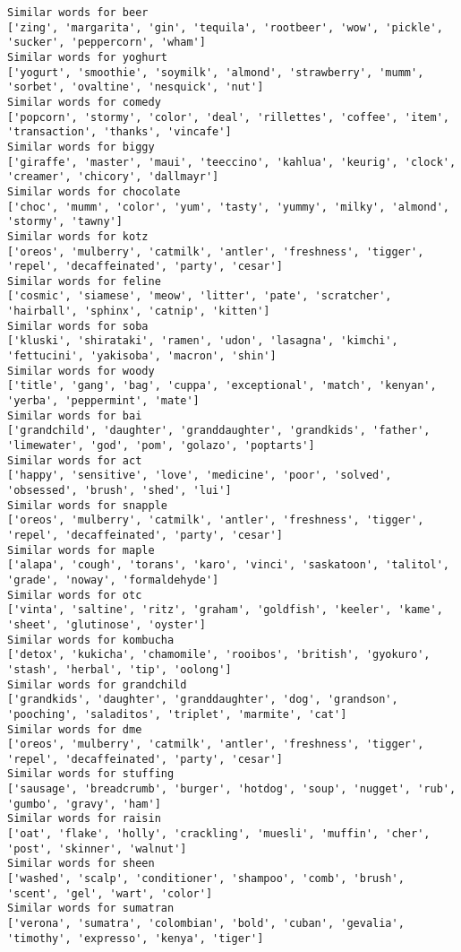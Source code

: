 \documentclass[11pt]{article}
\begin{document}
\begin{Verbatim}[commandchars=\\\{\}]
Similar words for beer
['zing', 'margarita', 'gin', 'tequila', 'rootbeer', 'wow', 'pickle', 'sucker', 'peppercorn', 'wham']
Similar words for yoghurt
['yogurt', 'smoothie', 'soymilk', 'almond', 'strawberry', 'mumm', 'sorbet', 'ovaltine', 'nesquick', 'nut']
Similar words for comedy
['popcorn', 'stormy', 'color', 'deal', 'rillettes', 'coffee', 'item', 'transaction', 'thanks', 'vincafe']
Similar words for biggy
['giraffe', 'master', 'maui', 'teeccino', 'kahlua', 'keurig', 'clock', 'creamer', 'chicory', 'dallmayr']
Similar words for chocolate
['choc', 'mumm', 'color', 'yum', 'tasty', 'yummy', 'milky', 'almond', 'stormy', 'tawny']
Similar words for kotz
['oreos', 'mulberry', 'catmilk', 'antler', 'freshness', 'tigger', 'repel', 'decaffeinated', 'party', 'cesar']
Similar words for feline
['cosmic', 'siamese', 'meow', 'litter', 'pate', 'scratcher', 'hairball', 'sphinx', 'catnip', 'kitten']
Similar words for soba
['kluski', 'shirataki', 'ramen', 'udon', 'lasagna', 'kimchi', 'fettucini', 'yakisoba', 'macron', 'shin']
Similar words for woody
['title', 'gang', 'bag', 'cuppa', 'exceptional', 'match', 'kenyan', 'yerba', 'peppermint', 'mate']
Similar words for bai
['grandchild', 'daughter', 'granddaughter', 'grandkids', 'father', 'limewater', 'god', 'pom', 'golazo', 'poptarts']
Similar words for act
['happy', 'sensitive', 'love', 'medicine', 'poor', 'solved', 'obsessed', 'brush', 'shed', 'lui']
Similar words for snapple
['oreos', 'mulberry', 'catmilk', 'antler', 'freshness', 'tigger', 'repel', 'decaffeinated', 'party', 'cesar']
Similar words for maple
['alapa', 'cough', 'torans', 'karo', 'vinci', 'saskatoon', 'talitol', 'grade', 'noway', 'formaldehyde']
Similar words for otc
['vinta', 'saltine', 'ritz', 'graham', 'goldfish', 'keeler', 'kame', 'sheet', 'glutinose', 'oyster']
Similar words for kombucha
['detox', 'kukicha', 'chamomile', 'rooibos', 'british', 'gyokuro', 'stash', 'herbal', 'tip', 'oolong']
Similar words for grandchild
['grandkids', 'daughter', 'granddaughter', 'dog', 'grandson', 'pooching', 'saladitos', 'triplet', 'marmite', 'cat']
Similar words for dme
['oreos', 'mulberry', 'catmilk', 'antler', 'freshness', 'tigger', 'repel', 'decaffeinated', 'party', 'cesar']
Similar words for stuffing
['sausage', 'breadcrumb', 'burger', 'hotdog', 'soup', 'nugget', 'rub', 'gumbo', 'gravy', 'ham']
Similar words for raisin
['oat', 'flake', 'holly', 'crackling', 'muesli', 'muffin', 'cher', 'post', 'skinner', 'walnut']
Similar words for sheen
['washed', 'scalp', 'conditioner', 'shampoo', 'comb', 'brush', 'scent', 'gel', 'wart', 'color']
Similar words for sumatran
['verona', 'sumatra', 'colombian', 'bold', 'cuban', 'gevalia', 'timothy', 'expresso', 'kenya', 'tiger']

\end{Verbatim}
\end{document}
